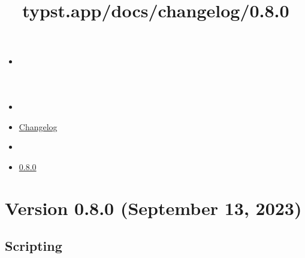 \title{typst.app/docs/changelog/0.8.0}

\begin{itemize}
\tightlist
\item
  \href{/docs}{}
\item
  
\item
  \href{/docs/changelog/}{Changelog}
\item
  
\item
  \href{/docs/changelog/0.8.0/}{0.8.0}
\end{itemize}

\section{Version 0.8.0 (September 13,
2023)}\label{version-0.8.0-september-13-2023}

\subsection{Scripting}\label{scripting}

